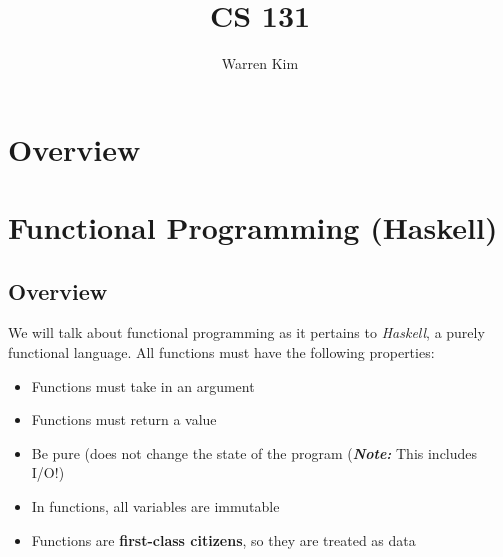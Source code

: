 \documentclass[13pt]{article}
\title{CS 131}
\author{Warren Kim}
\begin{document}
\maketitle

\tableofcontents

\newpage
\section{Overview}
\section{Functional Programming (Haskell)}
\subsection{Overview}
We will talk about functional programming as it pertains to
\textit{Haskell}, a purely functional language. All functions must
have the following properties:
\begin{itemize}[leftmargin=*]
\item Functions must take in an argument
\item Functions must return a value
\item Be pure (does not change the state of the program
  (\textit{\textbf{Note:}} This includes I/O!)
\item In functions, all variables are immutable
\item Functions are \textbf{first-class citizens}, so they are treated
  as data
\end{itemize}


\end{document}
